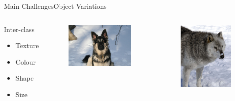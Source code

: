 \begin{frame}{Main Challenges}{Object Variations}
\begin{columns}
        \begin{block}{Inter-class}
        \begin{itemize}
            \item Texture
            \item Colour
            \item Shape
            \item Size
        \end{itemize}
            

        \end{block}
        \begin{figure}
            \includegraphics[width=1.0 \textwidth]{figs/germanshepherd.jpeg}
        \end{figure}
        \begin{figure}
            \includegraphics[width=0.7 \textwidth]{figs/wolf.jpeg}
        \end{figure}
    \end{columns}
\end{frame}

